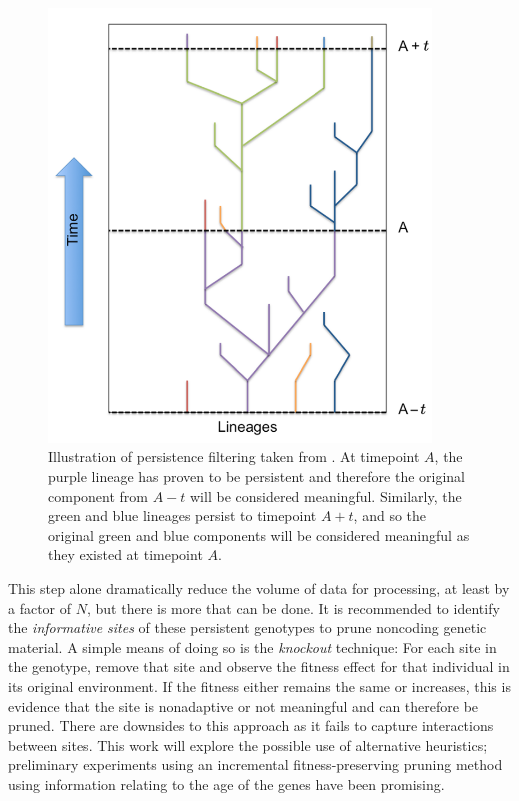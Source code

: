 \documentclass{article}
\begin{document}
\begin{figure}[H]
    \begin{center}
        \includegraphics[width=4in]{modes.png}
        \caption{Illustration of persistence filtering taken from \citet{dolson2019modes}.
        At timepoint $A$, the purple lineage has proven to be persistent and therefore the 
        original component from $A - t$ will be considered meaningful. Similarly, the green and 
        blue lineages persist to timepoint $A + t$, and so the original green and blue 
        components will be considered meaningful as they existed at timepoint $A$.}
        \label{modes}
    \end{center}
\end{figure}

This step alone dramatically reduce the volume of data for processing, at least by a factor of 
$N$, but there is more that can be done. It is recommended to identify the 
\textit{informative sites} of these persistent genotypes to prune noncoding genetic material. 
A simple means of doing so is the \textit{knockout} technique: For each site in the genotype, 
remove that site and observe the fitness effect for that individual in its original environment. 
If the fitness either remains the same or increases, this is evidence that the site is nonadaptive 
or not meaningful and can therefore be pruned. There are downsides to this approach as it fails to 
capture interactions between sites. This work will explore the possible use of alternative 
heuristics; preliminary experiments using an incremental fitness-preserving pruning method 
using information relating to the age of the genes have been promising.
\end{document}

